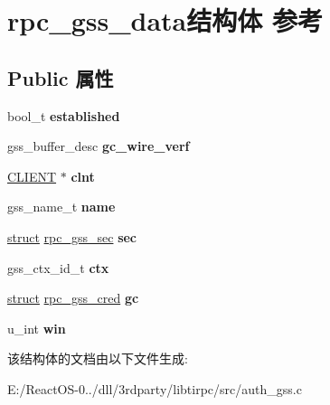 \hypertarget{structrpc__gss__data}{}\section{rpc\+\_\+gss\+\_\+data结构体 参考}
\label{structrpc__gss__data}
\subsection*{Public 属性}
\begin{DoxyCompactItemize}
\item 
\mbox{\label{structrpc__gss__data_a2f9a8f35b78e0dc60b65e0e40b3da1c4}} 
bool\+\_\+t {\bfseries established}
\item 
\mbox{\label{structrpc__gss__data_a03675fc058d22e4ba625c5e4c2933187}} 
gss\+\_\+buffer\+\_\+desc {\bfseries gc\+\_\+wire\+\_\+verf}
\item 
\mbox{\label{structrpc__gss__data_a6c9b727b69cf2020958182f946e27033}} 
\hyperlink{struct____rpc__client}{C\+L\+I\+E\+NT} $\ast$ {\bfseries clnt}
\item 
\mbox{\label{structrpc__gss__data_a569f5b351640ff057b362cb8af59272d}} 
gss\+\_\+name\+\_\+t {\bfseries name}
\item 
\mbox{\label{structrpc__gss__data_ab91257836b3dd1bb8ec0520bbd8ac9e0}} 
\hyperlink{interfacestruct}{struct} \hyperlink{structrpc__gss__sec}{rpc\+\_\+gss\+\_\+sec} {\bfseries sec}
\item 
\mbox{\label{structrpc__gss__data_a3e825d74fe7a1faa819fb345b5d0834d}} 
gss\+\_\+ctx\+\_\+id\+\_\+t {\bfseries ctx}
\item 
\mbox{\label{structrpc__gss__data_a97bfefe7013a3bf69cb3b5edc53188e4}} 
\hyperlink{interfacestruct}{struct} \hyperlink{structrpc__gss__cred}{rpc\+\_\+gss\+\_\+cred} {\bfseries gc}
\item 
\mbox{\label{structrpc__gss__data_ab064766bba2fd4ea0ce2dafa59255e9a}} 
u\+\_\+int {\bfseries win}
\end{DoxyCompactItemize}


该结构体的文档由以下文件生成\+:\begin{DoxyCompactItemize}
\item 
E\+:/\+React\+O\+S-\/0../dll/3rdparty/libtirpc/src/auth\+\_\+gss.\+c\end{DoxyCompactItemize}
